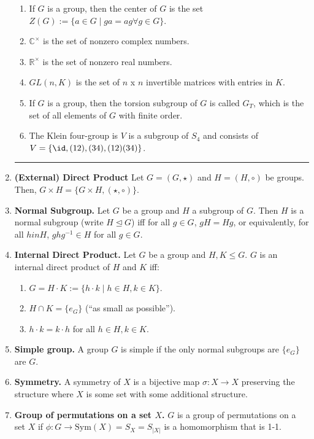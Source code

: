 \begin{enumerate}
\begin{enumerate}
		\item If $G$ is a group, then the center of $G$ is the set $Z(G) := \{a \in G \mid ga=ag \forall g \in G\}$. 
		\item $\mathbb{C}^\times$ is the set of nonzero complex numbers. 
		\item $\mathbb{R}^\times$ is the set of nonzero real numbers. 
		\item $GL(n,K)$ is the set of $n$ x $n$ invertible matrices with entries in $K$. 
		\item If $G$ is a group, then the torsion subgroup of $G$ is called $G_T$, which is the set of all elements of $G$ with finite order.
		\item The Klein four-group is $V$ is a subgroup of $S_4$ and consists of $V=\{\id, (12), (34), (12)(34)\}$. 
	\end{enumerate} 
	\begin{center}
		\hrule
	\end{center}
	\item \textbf{(External) Direct Product} Let $G = (G,\star)$ and $H = (H, \circ)$ be groups. Then, $G \times H = \{G \times H, (\star, \circ)\}$. 
	\item \textbf{Normal Subgroup. } Let $G$ be a group and $H$ a subgroup of $G$. Then $H$ is a normal subgroup (write $H \unlhd G$) iff for all $g \in G$, $gH=Hg$, or equivalently, for all $h in H$, $ghg^{-1} \in H$ for all $g \in G$. 
	\item \textbf{Internal Direct Product. } Let $G$ be a group and $H,K \leq G$. $G$ is an internal direct product of $H$ and $K$ iff: 
	\begin{enumerate}
		\item $G=H \cdot K := \{h \cdot k \mid h \in H, k \in K\}$. 
		\item $H \cap K = \{e_G\}$ (\enquote{as small as possible}). 
		\item $h \cdot k = k \cdot h$ for all $h \in H, k \in K$. 
	\end{enumerate}
	\item \textbf{Simple group. } A group $G$ is simple if the only normal subgroups are $\{e_G\}$ are $G$. 
	\item \textbf{Symmetry. } A symmetry of $X$ is a bijective map $\sigma: X \to X$ preserving the structure where $X$ is some set with some additional structure. 
	\item \textbf{Group of permutations on a set $X$. } $G$ is a group of permutations on a set $X$ if $\phi: G \to \textrm{Sym}(X)=S_X=S_{|X|}$ is a homomorphism that is 1-1. 

\end{enumerate}
